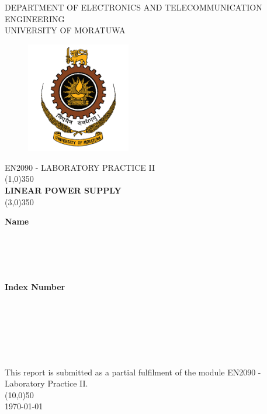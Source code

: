 \documentclass[11pt]{article}
\begin{document}
\begin{titlepage}
\begin{center}
   \textsc{\large DEPARTMENT OF ELECTRONICS AND TELECOMMUNICATION ENGINEERING\\
   [2mm]
   UNIVERSITY OF MORATUWA}\\
   [0.75cm]
   \begin{figure}[H]
   \centering
   \includegraphics[height=1.9in]{UoM.png}\\
   [1.5cm]
   \end{figure}
   
   \MakeUppercase{\textsc{\LARGE EN2090 - LABORATORY PRACTICE II}}\\
   [2mm] 
   \line(1,0){350}\\
   [1mm]
    \huge{\bfseries LINEAR POWER SUPPLY} \\
   \line(3,0){350}\\
[1.2cm]  
\end{center}
\begin{minipage}{0.5\textwidth}
\begin{flushleft}
    \textbf{\large Name}\\
    \\
    \\
    \\
    \\
    
\end{flushleft}
\end{minipage}
\hfill
\begin{minipage}{0.5\textwidth}
\begin{flushright}
    \textbf{\large Index Number}\\
    \\
    \\
    \\
    \\
\end{flushright}
\end{minipage}\\
[1.2cm]
\begin{center}
This report is submitted as a partial fulfilment of the module EN2090 - Laboratory Practice II.\\
\line(10,0){50}\\
[0.5cm]
\today
\end{center}
\end{titlepage}
\end{document}
